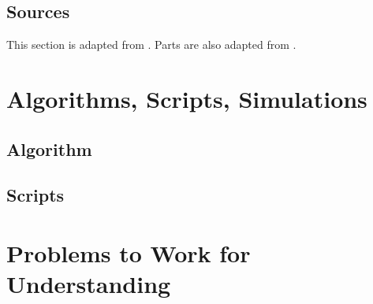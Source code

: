 \documentclass[12pt]{article}
\begin{document}
\subsection*{Sources} This section is adapted from
\cite{mann94}. Parts are also adapted from
\cite{aldous86}.

\hr

\section*{Algorithms, Scripts, Simulations}

\subsection*{Algorithm}

\subsection*{Scripts}

% 

\hr

\section*{Problems to Work for Understanding}

\renewcommand{\theexerciseseries}{}
\renewcommand{\theexercise}{\arabic{exercise}}
\end{document}
